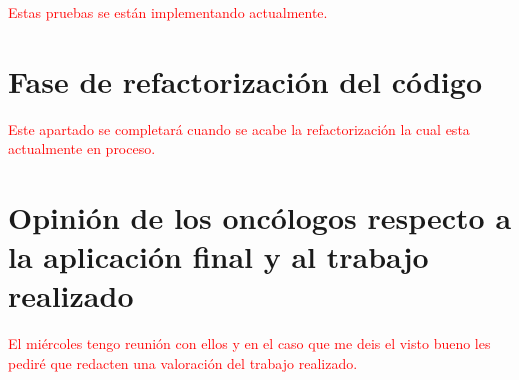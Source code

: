 \textcolor{red}{Estas pruebas se están implementando actualmente.}

\section{Fase de refactorización del código}

\textcolor{red}{Este apartado se completará cuando se acabe la refactorización la cual esta actualmente en proceso.}

\section{Opinión de los oncólogos respecto a la aplicación final y al trabajo realizado}

\textcolor{red}{El miércoles tengo reunión con ellos y en el caso que me deis el visto bueno les pediré que redacten una valoración del trabajo realizado.}

